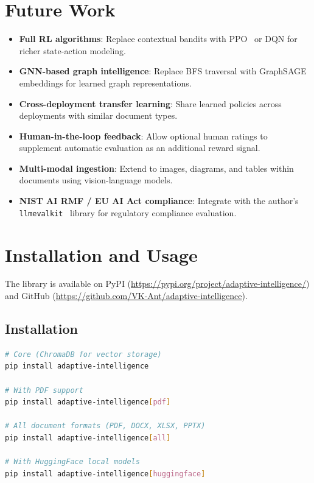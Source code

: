 \documentclass[11pt]{article}
\begin{document}
\section{Future Work}
\label{sec:future}

\begin{itemize}
    \item \textbf{Full RL algorithms}: Replace contextual bandits with PPO~\cite{schulman2017ppo} or DQN for richer state-action modeling.
    \item \textbf{GNN-based graph intelligence}: Replace BFS traversal with GraphSAGE~\cite{hamilton2017graphsage} embeddings for learned graph representations.
    \item \textbf{Cross-deployment transfer learning}: Share learned policies across deployments with similar document types.
    \item \textbf{Human-in-the-loop feedback}: Allow optional human ratings to supplement automatic evaluation as an additional reward signal.
    \item \textbf{Multi-modal ingestion}: Extend to images, diagrams, and tables within documents using vision-language models.
    \item \textbf{NIST AI RMF / EU AI Act compliance}: Integrate with the author's \texttt{llmevalkit}~\cite{venkatkumar2025llmevalkit} library for regulatory compliance evaluation.
\end{itemize}

\appendix
\section{Installation and Usage}
\label{app:install}

The library is available on PyPI (\url{https://pypi.org/project/adaptive-intelligence/}) and GitHub (\url{https://github.com/VK-Ant/adaptive-intelligence}).

\subsection{Installation}

\begin{lstlisting}[language=bash, caption={Installation options.}]
# Core (ChromaDB for vector storage)
pip install adaptive-intelligence

# With PDF support
pip install adaptive-intelligence[pdf]

# All document formats (PDF, DOCX, XLSX, PPTX)
pip install adaptive-intelligence[all]

# With HuggingFace local models
pip install adaptive-intelligence[huggingface]
\end{lstlisting}
\end{document}
